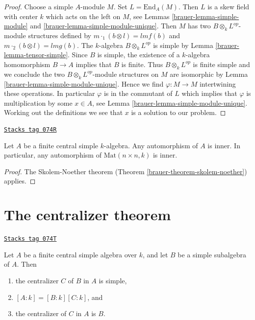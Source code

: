 \begin{proof}

Choose a simple $A$-module $M$. Set $L = \text{End}_A(M)$.
Then $L$ is a skew field with center $k$ which acts on the left on $M$, see
Lemmas \ref{brauer-lemma-simple-module} and \ref{brauer-lemma-simple-module-unique}.
Then $M$ has two $B \otimes_k L^{op}$-module structures defined by
$m \cdot_1 (b \otimes l) = lmf(b)$ and $m \cdot_2 (b \otimes l) = lmg(b)$.
The $k$-algebra $B \otimes_k L^{op}$ is simple by
Lemma \ref{brauer-lemma-tensor-simple}. Since $B$ is simple, the existence of a
$k$-algebra homomorphism $B \to A$ implies that $B$ is finite. Thus
$B \otimes_k L^{op}$ is finite simple and we conclude the two
$B \otimes_k L^{op}$-module structures on $M$
are isomorphic by Lemma \ref{brauer-lemma-simple-module-unique}.
Hence we find $\varphi : M \to M$ intertwining these operations.
In particular $\varphi$ is in the commutant of $L$ which implies that
$\varphi$ is multiplication by some $x \in A$, see
Lemma \ref{brauer-lemma-simple-module-unique}. Working out the definitions we see
that $x$ is a solution to our problem.
\end{proof}

\begin{lemma}
\label{brauer-lemma-automorphism-inner}
\href{https://stacks.math.columbia.edu/tag/074R}{\texttt{Stacks tag 074R}}

Let $A$ be a finite central simple $k$-algebra. Any automorphism of $A$ is
inner. In particular, any automorphism of $\text{Mat}(n \times n, k)$
is inner.
\end{lemma}

\begin{proof}

The Skolem-Noether theorem (Theorem \ref{brauer-theorem-skolem-noether})
applies.
\end{proof}

\section{The centralizer theorem}
\label{brauer-section-centralizer}
\begin{theorem}[Centralizer]
\label{brauer-theorem-centralizer}
\href{https://stacks.math.columbia.edu/tag/074T}{\texttt{Stacks tag 074T}}

Let $A$ be a finite central simple algebra over $k$, and let
$B$ be a simple subalgebra of $A$. Then
\begin{enumerate}
\item the centralizer $C$ of $B$ in $A$ is simple,
\item $[A : k] = [B : k][C : k]$, and
\item the centralizer of $C$ in $A$ is $B$.
\end{enumerate}
\end{theorem}

